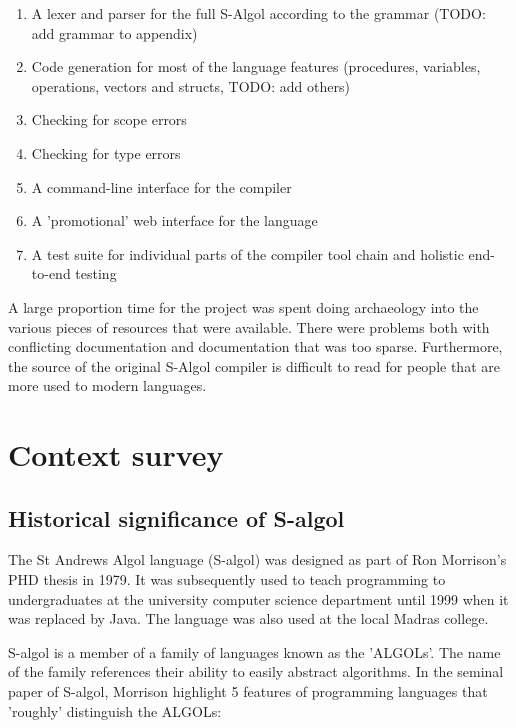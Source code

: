 \documentclass{article}
\begin{document}
\begin{enumerate}
\item A lexer and parser for the full S-Algol according to the grammar (TODO: add grammar to appendix)
\item Code generation for most of the language features (procedures, variables, operations, vectors and structs, TODO: add others)
\item Checking for scope errors
\item Checking for type errors
\item A command-line interface for the compiler
\item A 'promotional' web interface for the language
\item A test suite for individual parts of the compiler tool chain and holistic end-to-end testing
\end{enumerate}

A large proportion time for the project was spent doing archaeology into the various pieces of resources that were available. There were problems both with conflicting documentation and documentation that was too sparse. Furthermore, the source of the original S-Algol compiler is difficult to read for people that are more used to modern languages.


\section{Context survey}

\subsection{Historical significance of S-algol}

The St Andrews Algol language (S-algol) was designed as part of Ron Morrison's PHD thesis in 1979. It was subsequently used to teach programming to undergraduates at the university computer science department until 1999 when it was replaced by Java. The language was also used at the local Madras college.

S-algol is a member of a family of languages known as the 'ALGOLs'. The name of the family references their ability to easily abstract algorithms. In the seminal paper of S-algol, Morrison highlight 5 features of programming languages that 'roughly' distinguish the ALGOLs:
\end{document}
